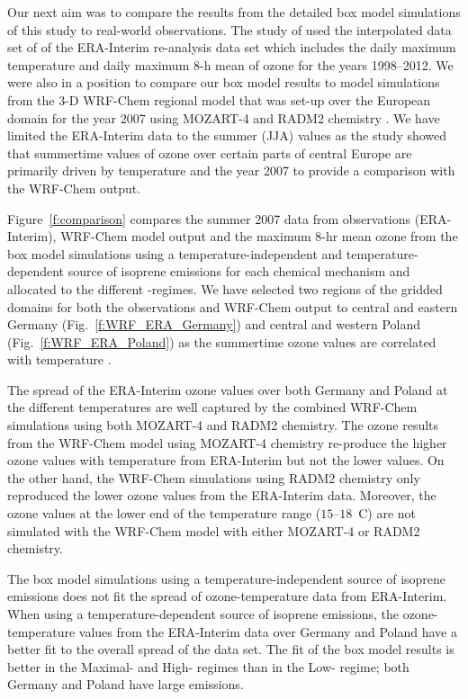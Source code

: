 Our next aim was to compare the results from the detailed box model simulations of this study to real-world observations.
The study of \citet{Otero:2016} used the interpolated data set of \citet{Schnell:2015} of the ERA-Interim re-analysis data set \citep{Dee:2011} which includes the daily maximum temperature and daily maximum 8-h mean of ozone for the years 1998--2012.
We were also in a position to compare our box model results to model simulations from the 3-D WRF-Chem regional model that was set-up over the European domain for the year 2007 using MOZART-4 and RADM2 chemistry .
We have limited the ERA-Interim data to the summer (JJA) values as the \citet{Otero:2016} study showed that summertime values of ozone over certain parts of central Europe are primarily driven by temperature and the year 2007 to provide a comparison with the WRF-Chem output.

Figure~\ref{f:comparison} compares the summer 2007 data from observations (ERA-Interim), WRF-Chem model output and the maximum 8-hr mean ozone from the box model simulations using a temperature-independent and temperature-dependent source of isoprene emissions for each chemical mechanism and allocated to the different -regimes.
We have selected two regions of the gridded domains for both the observations and WRF-Chem output to central and eastern Germany (Fig.~\ref{f:WRF_ERA_Germany}) and central and western Poland (Fig.~\ref{f:WRF_ERA_Poland}) as the summertime ozone values are correlated with temperature \citep{Otero:2016}.

The spread of the ERA-Interim ozone values over both Germany and Poland at the different temperatures are well captured by the combined WRF-Chem simulations using both MOZART-4 and RADM2 chemistry. 
The ozone results from the WRF-Chem model using MOZART-4 chemistry re-produce the higher ozone values with temperature from ERA-Interim but not the lower values.
On the other hand, the WRF-Chem simulations using RADM2 chemistry only reproduced the lower ozone values from the ERA-Interim data.
Moreover, the ozone values at the lower end of the temperature range ($15$--$18$~\degree C) are not simulated with the WRF-Chem model with either MOZART-4 or RADM2 chemistry.

The box model simulations using a temperature-independent source of isoprene emissions does not fit the spread of ozone-temperature data from ERA-Interim.
When using a temperature-dependent source of isoprene emissions, the ozone-temperature values from the ERA-Interim data over Germany and Poland have a better fit to the overall spread of the data set. 
The fit of the box model results is better in the Maximal- and High- regimes than in the Low- regime; both Germany and Poland have large  emissions. 

